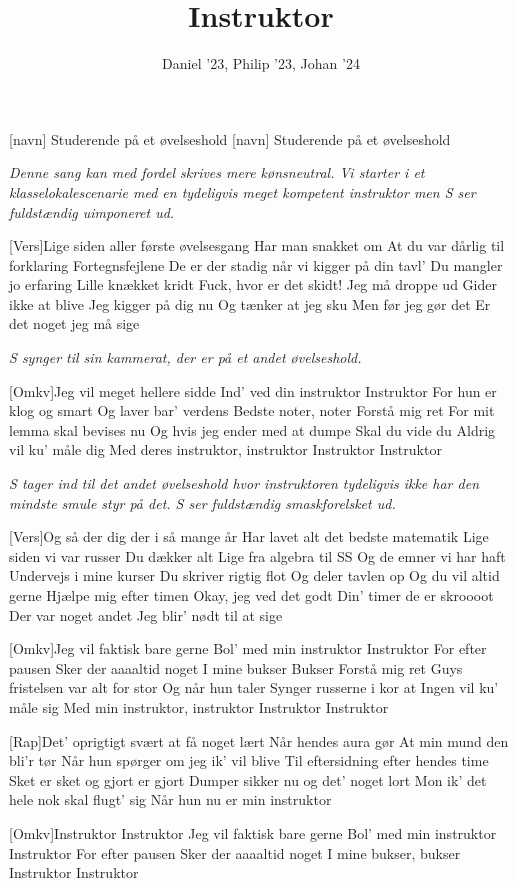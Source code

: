 \documentclass[a4paper,11pt]{article}
\title{Instruktor}
\author{Daniel '23, Philip '23, Johan '24}
\begin{document}
\maketitle

\begin{roles}
[navn] Studerende på et øvelseshold
[navn] Studerende på et øvelseshold
\end{roles}

\begin{song}

\noindent\textit{Denne sang kan med fordel skrives mere kønsneutral. Vi starter i et klasselokalescenarie med en tydeligvis meget kompetent instruktor men S ser fuldstændig uimponeret ud.}

    [Vers]Lige siden aller første øvelsesgang
Har man snakket om
At du var dårlig til forklaring
Fortegnsfejlene
De er der stadig når vi kigger på din tavl'
Du mangler jo erfaring
Lille knækket kridt
Fuck, hvor er det skidt!
Jeg må droppe ud
Gider ikke at blive
Jeg kigger på dig nu
Og tænker at jeg sku
Men før jeg gør det
Er det noget jeg må sige

\textit{S synger til sin kammerat, der er på et andet øvelseshold.}

    [Omkv]Jeg vil meget hellere sidde
Ind' ved din instruktor
Instruktor
For hun er klog og smart
Og laver bar' verdens
Bedste noter, noter
Forstå mig ret
For mit lemma skal bevises nu
Og hvis jeg ender med at dumpe
Skal du vide du
Aldrig vil ku' måle dig
Med deres instruktor, instruktor
Instruktor
Instruktor

\noindent\textit{S tager ind til det andet øvelseshold hvor instruktoren tydeligvis ikke har den mindste smule styr på det. S ser fuldstændig smaskforelsket ud.}

    [Vers]Og så der dig der i så mange år
Har lavet alt det bedste matematik
Lige siden vi var russer
Du dækker alt
Lige fra algebra til SS
Og de emner vi har haft
Undervejs i mine kurser
Du skriver rigtig flot
Og deler tavlen op
Og du vil altid gerne
Hjælpe mig efter timen
Okay, jeg ved det godt
Din' timer de er skroooot
Der var noget andet
Jeg blir' nødt til at sige

    [Omkv]Jeg vil faktisk bare gerne
Bol' med min instruktor
Instruktor
For efter pausen
Sker der aaaaltid noget
I mine bukser
Bukser
Forstå mig ret
Guys fristelsen var alt for stor
Og når hun taler
Synger russerne i kor at
Ingen vil ku' måle sig
Med min instruktor, instruktor
Instruktor
Instruktor

    [Rap]Det' oprigtigt svært at få noget lært
Når hendes aura gør
At min mund den bli'r tør
Når hun spørger om jeg ik' vil blive
Til eftersidning efter hendes time
Sket er sket og gjort er gjort
Dumper sikker nu og det' noget lort
Mon ik' det hele nok skal flugt' sig
Når hun nu er min instruktor

    [Omkv]Instruktor
Instruktor
Jeg vil faktisk bare gerne
Bol' med min instruktor
Instruktor
For efter pausen
Sker der aaaaltid noget
I mine bukser, bukser
Instruktor
Instruktor

\end{song}
\end{document}
